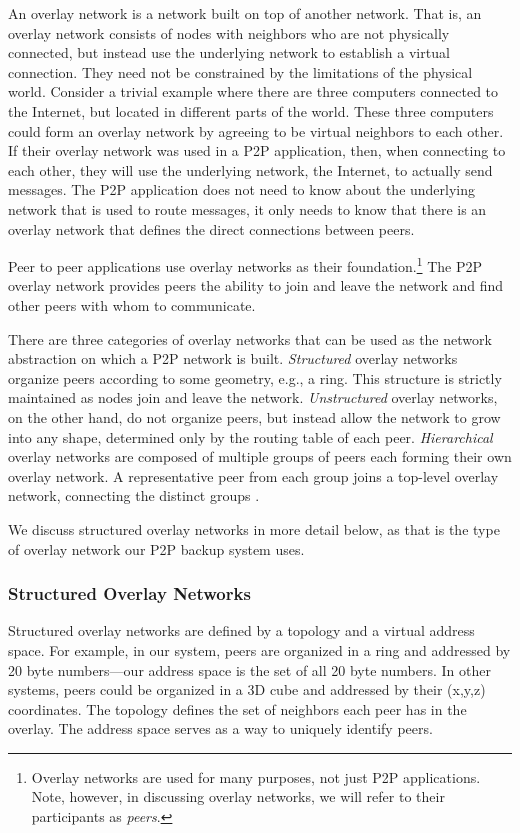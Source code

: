 \documentclass[12pt]{report}
\begin{document}
An overlay network is a network built on top of another network. That is, an overlay network consists of nodes with neighbors who are not physically connected, but instead use the underlying network to establish a virtual connection. They need not be constrained by the limitations of the physical world. Consider a trivial example where there are three computers connected to the Internet, but located in different parts of the world. These three computers could form an overlay network by agreeing to be virtual neighbors to each other. If their overlay network was used in a P2P application, then, when connecting to each other, they will use the underlying network, the Internet, to actually send messages. The P2P application does not need to know about the underlying network that is used to route messages, it only needs to know that there is an overlay network that defines the direct connections between peers.

Peer to peer applications use overlay networks as their foundation.\footnote{Overlay networks are used for many purposes, not just P2P applications. Note, however, in discussing overlay networks, we will refer to their participants as \textit{peers}.}  The P2P overlay network provides peers the ability to join and leave the network and find other peers with whom to communicate.

There are three categories of overlay networks that can be used as the network abstraction on which a P2P network is built. \textit{Structured} overlay networks organize peers according to some geometry, e.g., a ring. This structure is strictly maintained as nodes join and leave the network. \textit{Unstructured} overlay networks, on the other hand, do not organize peers, but instead allow the network to grow into any shape, determined only by the routing table of each peer. \textit{Hierarchical} overlay networks are composed of multiple groups of peers each forming their own overlay network. A representative peer from each group joins a top-level overlay network, connecting the distinct groups \cite{p2pSurvey}. 

We discuss structured overlay networks in more detail below, as that is the type of overlay network our P2P backup system uses.

\subsubsection{Structured Overlay Networks}

Structured overlay networks are defined by a topology and a virtual address space. For example, in our system, peers are organized in a ring and addressed by 20 byte numbers---our address space is the set of all 20 byte numbers. In other systems, peers could be organized in a 3D cube and addressed by their (x,y,z) coordinates. The topology defines the set of neighbors each peer has in the overlay. The address space serves as a way to uniquely identify peers.
\end{document}
